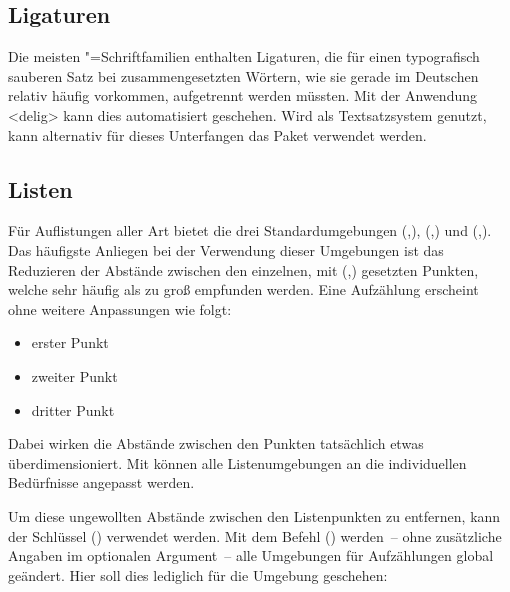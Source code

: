 \documentclass[%
  english,ngerman,%
  cdgeometry=no,DIV=12,automark%
]{tudscrartcl}
\begin{document}
\subsection{Ligaturen}
Die meisten "=Schriftfamilien enthalten Ligaturen, die für einen 
typografisch sauberen Satz bei zusammengesetzten Wörtern, wie sie gerade im 
Deutschen relativ häufig vorkommen, aufgetrennt werden müssten. Mit der 
Anwendung <delig> kann dies automatisiert geschehen. Wird 
 als Textsatzsystem genutzt, kann alternativ für dieses 
Unterfangen das Paket  verwendet werden.


\subsection{Listen}
\label{sec:lists}%
%
Für Auflistungen aller Art bietet  die drei Standardumgebungen 
(,),
(,) und
(,). Das 
häufigste Anliegen bei der Verwendung dieser Umgebungen ist das Reduzieren 
der Abstände zwischen den einzelnen, mit 
(,) gesetzten Punkten, 
welche sehr häufig als zu groß empfunden werden. Eine Aufzählung erscheint ohne 
weitere Anpassungen wie folgt:
%
\begin{Hint*}
\begin{itemize}
\item erster Punkt
\item zweiter Punkt
\item dritter Punkt
\end{itemize}
\end{Hint*}
%
Dabei wirken die Abstände zwischen den Punkten tatsächlich etwas 
überdimensioniert. Mit  können alle Listenumgebungen an die 
individuellen Bedürfnisse angepasst werden. 
%
\begin{Preamble}
\usepackage{enumitem}
\end{Preamble}
%
Um diese ungewollten Abstände zwischen den Listenpunkten zu entfernen, kann der 
Schlüssel () verwendet werden. Mit dem 
Befehl () werden~-- ohne zusätzliche Angaben 
im optionalen Argument~-- alle Umgebungen für Aufzählungen global geändert. 
Hier soll dies lediglich für die Umgebung  geschehen:
\end{document}
